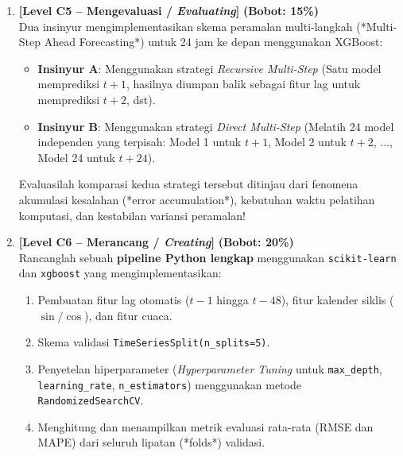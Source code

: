 \documentclass[11pt,a4paper]{article}
\begin{document}
\begin{enumerate}[leftmargin=1.5em, label=\textbf{Soal \arabic*.}]
    \vspace{0.4cm}

    \item \textbf{[Level C5 -- Mengevaluasi / \textit{Evaluating}]} \hfill \textbf{(Bobot: 15\%)} \\
    Dua insinyur mengimplementasikan skema peramalan multi-langkah (*Multi-Step Ahead Forecasting*) untuk 24 jam ke depan menggunakan XGBoost:
    \begin{itemize}
        \item \textbf{Insinyur A}: Menggunakan strategi \textit{Recursive Multi-Step} (Satu model memprediksi $t+1$, hasilnya diumpan balik sebagai fitur lag untuk memprediksi $t+2$, dst).
        \item \textbf{Insinyur B}: Menggunakan strategi \textit{Direct Multi-Step} (Melatih 24 model independen yang terpisah: Model 1 untuk $t+1$, Model 2 untuk $t+2$, ..., Model 24 untuk $t+24$).
    \end{itemize}
    Evaluasilah komparasi kedua strategi tersebut ditinjau dari fenomena akumulasi kesalahan (*error accumulation*), kebutuhan waktu pelatihan komputasi, dan kestabilan variansi peramalan!

    \vspace{0.4cm}

    \item \textbf{[Level C6 -- Merancang / \textit{Creating}]} \hfill \textbf{(Bobot: 20\%)} \\
    Rancanglah sebuah \textbf{pipeline Python lengkap} menggunakan \texttt{scikit-learn} dan \texttt{xgboost} yang mengimplementasikan:
    \begin{enumerate}[label=\alph*.]
        \item Pembuatan fitur lag otomatis ($t-1$ hingga $t-48$), fitur kalender siklis ($\sin/\cos$), dan fitur cuaca.
        \item Skema validasi \texttt{TimeSeriesSplit(n\_splits=5)}.
        \item Penyetelan hiperparameter (\textit{Hyperparameter Tuning} untuk \texttt{max\_depth}, \texttt{learning\_rate}, \texttt{n\_estimators}) menggunakan metode \texttt{RandomizedSearchCV}.
        \item Menghitung dan menampilkan metrik evaluasi rata-rata (RMSE dan MAPE) dari seluruh lipatan (*folds*) validasi.
    \end{enumerate}

\end{enumerate}
\end{document}
